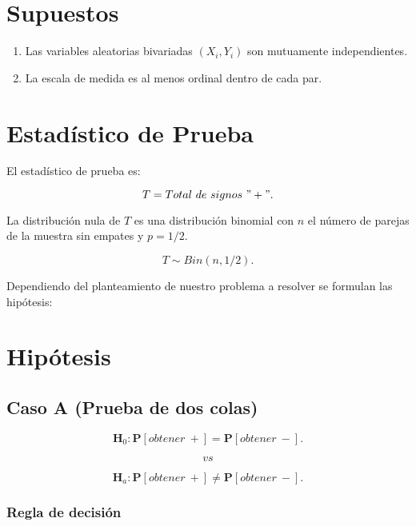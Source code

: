 \documentclass[
  a4paper,
  oneside,
  openany]{book}
\begin{document}
\hypertarget{supuestos-2}{%
\section{Supuestos}\label{supuestos-2}}

\begin{enumerate}
\def\labelenumi{\arabic{enumi})}
\item
  Las variables aleatorias bivariadas \((X_{i},Y_{i})\) son mutuamente independientes.
\item
  La escala de medida es al menos ordinal dentro de cada par.
\end{enumerate}

\hypertarget{estaduxedstico-de-prueba-2}{%
\section{Estadístico de Prueba}\label{estaduxedstico-de-prueba-2}}

El estadístico de prueba es:

\[T=Total\ de\ signos\ "+".\]

La distribución nula de \(T\) es una distribución binomial con \(n\) el número de parejas de la muestra sin empates y \(p=1/2\).

\[T\sim Bin(n,1/2).\]

Dependiendo del planteamiento de nuestro problema a resolver se formulan las hipótesis:

\hypertarget{hipuxf3tesis-2}{%
\section{Hipótesis}\label{hipuxf3tesis-2}}

\hypertarget{caso-a-prueba-de-dos-colas-2}{%
\subsection*{Caso A (Prueba de dos colas)}\label{caso-a-prueba-de-dos-colas-2}}


\[\textbf{H}_0: \mathbf{P}[obtener\ +]= \mathbf{P}[obtener\ -].\]

\[vs\]

\[\textbf{H}_a: \mathbf{P}[obtener\ +] \neq \mathbf{P}[obtener\ -].\]

\hypertarget{regla-de-decisiuxf3n-6}{%
\subsubsection*{Regla de decisión}\label{regla-de-decisiuxf3n-6}}
\end{document}
